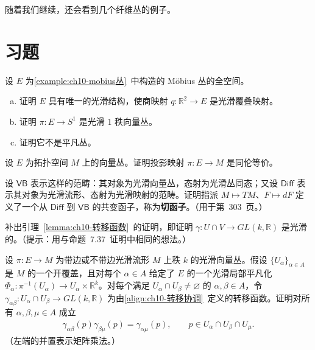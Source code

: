 \documentclass[../../main.tex]{subfiles}
\begin{document}
随着我们继续，还会看到几个纤维丛的例子。

\section*{习题}\label{section:ch10-习题}

\begin{exercise}\label{exercise:ch10-01}
设 $E$ 为\cref{example:ch10-mobius丛}~中构造的 Möbius 丛的全空间。
\begin{enumerate}[(a)]
\item 证明 $E$ 具有唯一的光滑结构，使商映射 $q\colon\mathbb{R}^2\to E$ 是光滑覆叠映射。
\item 证明 $\pi\colon E\to S^1$ 是光滑 $1$ 秩向量丛。
\item 证明它不是平凡丛。
\end{enumerate}
\end{exercise}

\begin{exercise}\label{exercise:ch10-02}
设 $E$ 为拓扑空间 $M$ 上的向量丛。证明投影映射 $\pi\colon E\to M$ 是同伦等价。
\end{exercise}

\begin{exercise}[切函子]\label{exercise:ch10-03}
设 $\mathsf{VB}$ 表示这样的范畴：其对象为光滑向量丛，态射为光滑丛同态；又设 $\mathsf{Diff}$ 表示其对象为光滑流形、态射为光滑映射的范畴。证明指派 $M\mapsto TM$、$F\mapsto dF$ 定义了一个从 $\mathsf{Diff}$ 到 $\mathsf{VB}$ 的共变函子，称为\textbf{切函子}。（用于第~303~页。）
\end{exercise}

\begin{exercise}\label{exercise:ch10-04}
补出引理~\ref{lemma:ch10-转移函数}~的证明，即证明 $\gamma\colon U\cap V\to GL(k,\mathbb{R})$ 是光滑的。（提示：用与命题~7.37~证明中相同的想法。）
\end{exercise}

\begin{exercise}[转移函数的上循环条件]\label{exercise:ch10-05}
设 $\pi\colon E\to M$ 为带边或不带边光滑流形 $M$ 上秩 $k$ 的光滑向量丛。假设 $\{U_\alpha\}_{\alpha\in A}$ 是 $M$ 的一个开覆盖，且对每个 $\alpha\in A$ 给定了 $E$ 的一个光滑局部平凡化 $\Phi_\alpha\colon\pi^{-1}(U_\alpha)\to U_\alpha\times\mathbb{R}^k$。对每个满足 $U_\alpha\cap U_\beta\neq\varnothing$ 的 $\alpha,\beta\in A$，令 $\gamma_{\alpha\beta}\colon U_\alpha\cap U_\beta\to GL(k,\mathbb{R})$ 为由\eqref{align:ch10-转移协调}~定义的转移函数。证明对所有 $\alpha,\beta,\mu\in A$ 成立
\begin{align}
\gamma_{\alpha\beta}(p)\gamma_{\beta\mu}(p)=\gamma_{\alpha\mu}(p),\qquad p\in U_\alpha\cap U_\beta\cap U_\mu.\label{align:ch10-上循环}
\end{align}
（左端的并置表示矩阵乘法。）
\end{exercise}
\end{document}
